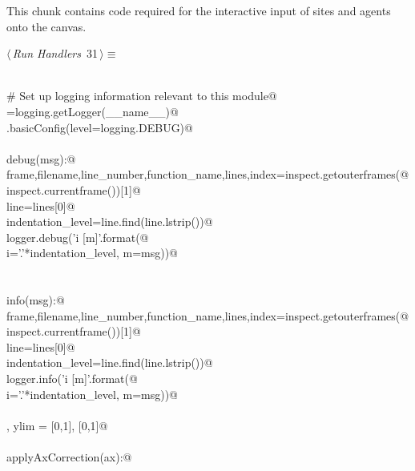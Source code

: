 \documentclass[10pt, english, oneside]{report}
\begin{document}
\begin{appendices}
This chunk contains code required for the interactive input of sites and agents onto the canvas. 

\begin{flushleft} \small\label{scrap33}\raggedright\small
{} $\langle\,${\itshape Run Handlers}\nobreak\ {\footnotesize {31}}$\,\rangle\equiv$
\vspace{-1ex}
\begin{list}{}{} \item
\mbox{}\verb@@\\
\mbox{}\verb@# Set up logging information relevant to this module@\\
\mbox{}\verb@logger=logging.getLogger(__name__)@\\
\mbox{}\verb@logging.basicConfig(level=logging.DEBUG)@\\
\mbox{}\verb@@\\
\mbox{}\verb@def debug(msg):@\\
\mbox{}\verb@    frame,filename,line_number,function_name,lines,index=inspect.getouterframes(@\\
\mbox{}\verb@        inspect.currentframe())[1]@\\
\mbox{}\verb@    line=lines[0]@\\
\mbox{}\verb@    indentation_level=line.find(line.lstrip())@\\
\mbox{}\verb@    logger.debug('{i} [{m}]'.format(@\\
\mbox{}\verb@        i='.'*indentation_level, m=msg))@\\
\mbox{}\verb@@\\
\mbox{}\verb@@\\
\mbox{}\verb@def info(msg):@\\
\mbox{}\verb@    frame,filename,line_number,function_name,lines,index=inspect.getouterframes(@\\
\mbox{}\verb@        inspect.currentframe())[1]@\\
\mbox{}\verb@    line=lines[0]@\\
\mbox{}\verb@    indentation_level=line.find(line.lstrip())@\\
\mbox{}\verb@    logger.info('{i} [{m}]'.format(@\\
\mbox{}\verb@        i='.'*indentation_level, m=msg))@\\
\mbox{}\verb@@\\
\mbox{}\verb@xlim, ylim = [0,1], [0,1]@\\
\mbox{}\verb@@\\
\mbox{}\verb@def applyAxCorrection(ax):@\\

\end{list}
\end{flushleft}
\end{appendices}
\end{document}
